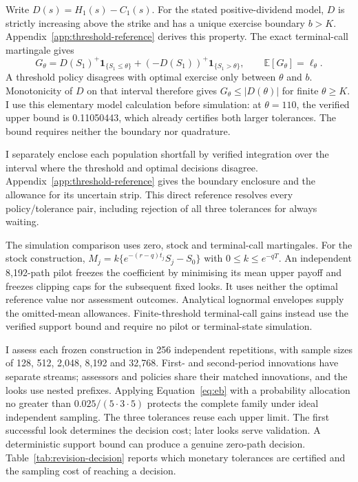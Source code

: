 \documentclass[11pt]{article}
\newcommand{\E}{\mathbb E}
\begin{document}
Write $D(s)=H_1(s)-C_1(s)$. For the stated positive-dividend model, $D$ is strictly increasing above the strike and has a unique exercise boundary $b>K$. Appendix~\ref{app:threshold-reference} derives this property. The exact terminal-call martingale gives
\begin{equation}
 G_\theta=D(S_1)^+\mathbf 1_{\{S_1\leq\theta\}}
             +(-D(S_1))^+\mathbf 1_{\{S_1>\theta\}},
 \qquad \E[G_\theta]=\ell_\theta.
\label{eq:thresholdgain}
\end{equation}
A threshold policy disagrees with optimal exercise only between $\theta$ and $b$. Monotonicity of $D$ on that interval therefore gives $G_\theta\leq|D(\theta)|$ for finite $\theta\geq K$. I use this elementary model calculation before simulation: at $\theta=110$, the verified upper bound is 0.11050443, which already certifies both larger tolerances. The bound requires neither the boundary nor quadrature.

I separately enclose each population shortfall by verified integration over the interval where the threshold and optimal decisions disagree. Appendix~\ref{app:threshold-reference} gives the boundary enclosure and the allowance for its uncertain strip. This direct reference resolves every policy/tolerance pair, including rejection of all three tolerances for always waiting.

The simulation comparison uses zero, stock and terminal-call martingales. For the stock construction, $M_j=k\{e^{-(r-q)t_j}S_j-S_0\}$ with $0\leq k\leq e^{-qT}$. An independent 8,192-path pilot freezes the coefficient by minimising its mean upper payoff and freezes clipping caps for the subsequent fixed looks. It uses neither the optimal reference value nor assessment outcomes. Analytical lognormal envelopes supply the omitted-mean allowances. Finite-threshold terminal-call gains instead use the verified support bound and require no pilot or terminal-state simulation.

I assess each frozen construction in 256 independent repetitions, with sample sizes of 128, 512, 2,048, 8,192 and 32,768. First- and second-period innovations have separate streams; assessors and policies share their matched innovations, and the looks use nested prefixes. Applying Equation~\eqref{eq:eb} with a probability allocation no greater than $0.025/(5\cdot3\cdot5)$ protects the complete family under ideal independent sampling. The three tolerances reuse each upper limit. The first successful look determines the decision cost; later looks serve validation. A deterministic support bound can produce a genuine zero-path decision. Table~\ref{tab:revision-decision} reports which monetary tolerances are certified and the sampling cost of reaching a decision.
\end{document}
